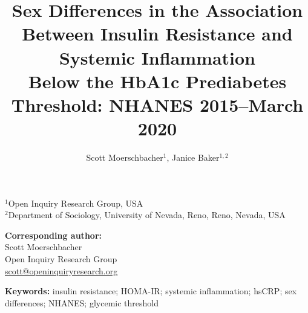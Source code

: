 \documentclass[11pt]{article}
\title{\textbf{Sex Differences in the Association Between Insulin Resistance and Systemic Inflammation}\\
\textbf{Below the HbA1c Prediabetes Threshold: NHANES 2015--March 2020}}
\begin{document}
\author{
Scott Moerschbacher$^{1}$,
Janice Baker$^{1,2}$
}

\date{}
\maketitle

\begin{center}
$^{1}$Open Inquiry Research Group, USA\\
$^{2}$Department of Sociology, University of Nevada, Reno,
Reno, Nevada, USA
\end{center}

\vspace{0.75em}

\begin{center}
\textbf{Corresponding author:}\\
Scott Moerschbacher\\
Open Inquiry Research Group\\
\href{mailto:scott@openinquiryresearch.org}
{scott@openinquiryresearch.org}
\end{center}

\vspace{0.5em}

\noindent\textbf{Keywords:}
insulin resistance; HOMA-IR; systemic inflammation; hsCRP;
sex differences; NHANES; glycemic threshold

\vspace{1em}
\end{document}
